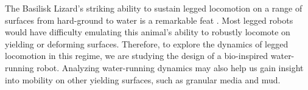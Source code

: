 The Basilisk Lizard's striking ability to sustain legged locomotion on a range of surfaces from hard-ground to water is a remarkable feat \cite{glasheen1996hydrodynamic}. Most legged robots would have difficulty emulating this animal's ability to robustly locomote on yielding or deforming surfaces. Therefore, to explore the dynamics of legged locomotion in this regime, we are studying the design of a bio-inspired water-running robot. Analyzing water-running dynamics may also help us gain insight into mobility on other yielding surfaces, such as granular media and mud.
